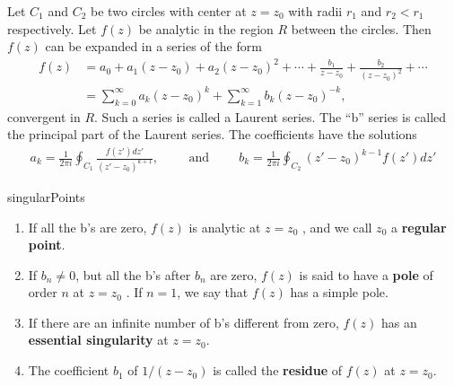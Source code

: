\begin{fancybox}{}
	Let $C_1$ and $C_2$ be two circles with center at $z=z_0$ with radii $r_1$ and $r_2 < r_1$ respectively. Let $f(z)$ be analytic in the region $R$ between the circles. Then $f(z)$ can be expanded in a series of the form
	\begin{align}
		f(z) &= a_0+a_1(z-z_0)+a_2(z-z_0)^2+\cdots + \frac{b_1}{z-z_0}+\frac{b_2}{(z-z_0)^2}+\cdots \\&= \sum_{k=0}^{\infty}a_k(z-z_0)^k+\sum_{k=1}^{\infty}b_k(z-z_0)^{-k},
	\end{align}
	convergent in $R$. Such a series is called a Laurent series. The “b” series is called the principal part of the Laurent series. The coefficients have the solutions 
	\begin{align}
		a_k=\frac{1}{2\pi i} \oint_{C_1}\frac{f(z')dz'}{(z' -z_0)^{k+1}},\hspace{1cm}\textrm{and}\hspace{1cm}b_k=\frac{1}{2\pi i} \oint_{C_2}(z' -z_0)^{k-1}f(z')dz'
	\end{align}
\end{fancybox}

\begin{defn}{singularPoints}
	\begin{enumerate}
		\item If all the b's are zero, $f (z)$ is analytic at $z = z_0$ , and we call $z_0$ a \textbf{regular point}.
		
		\item If $b_n \neq 0$, but all the b's after $b_n$ are zero, $f(z)$ is said to have a \textbf{pole} of order $n$ at $z = z_0$ . If $n = 1$, we say that $f(z)$ has a simple pole.
		
		\item If there are an infinite number of b's different from zero, $f(z)$ has an \textbf{essential
		singularity} at $z = z_0$.
		
		\item The coefficient $b_1$ of $1/(z-z_0)$ is called the \textbf{residue} of $f(z)$ at $z = z_0$.
	\end{enumerate}
\end{defn}
	
